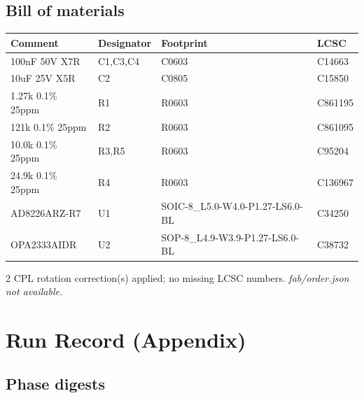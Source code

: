 \documentclass[11pt,a4paper]{article}
\begin{document}
\subsection*{Bill of materials}
{\small
\begin{longtable}{p{4.4cm}p{2.8cm}p{4.6cm}l}
\toprule
\textbf{Comment} & \textbf{Designator} & \textbf{Footprint} & \textbf{LCSC} \\
\midrule
\endhead
100nF 50V X7R & C1,C3,C4 & C0603 & C14663 \\
10uF 25V X5R & C2 & C0805 & C15850 \\
1.27k 0.1\% 25ppm & R1 & R0603 & C861195 \\
121k 0.1\% 25ppm & R2 & R0603 & C861095 \\
10.0k 0.1\% 25ppm & R3,R5 & R0603 & C95204 \\
24.9k 0.1\% 25ppm & R4 & R0603 & C136967 \\
AD8226ARZ-R7 & U1 & SOIC-8\_L5.0-W4.0-P1.27-LS6.0-BL & C34250 \\
OPA2333AIDR & U2 & SOP-8\_L4.9-W3.9-P1.27-LS6.0-BL & C38732 \\
\bottomrule
\end{longtable}
}
2 CPL rotation correction(s) applied; no missing LCSC numbers.
\emph{fab/order.json not available.}
\section{Run Record (Appendix)}
\subsection*{Phase digests}
\end{document}
